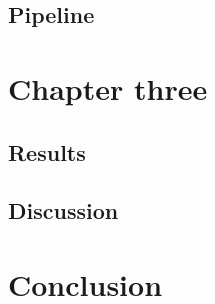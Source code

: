\documentclass[12pt,a4paper]{report}
\begin{document}
\section{Pipeline}

\chapter{Chapter three}

\section{Results}
\section{Discussion}

\chapter{Conclusion}


\end{document}
